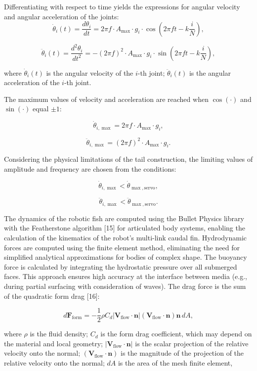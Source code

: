 \documentclass[12pt]{revtex4}
\begin{document}
Differentiating with respect to time yields the expressions for angular velocity and angular acceleration of the joints:
\[
\dot{\theta}_i(t) = \frac{d\theta_i}{dt} = 2\pi f \cdot A_{\max} \cdot g_i \cdot \cos\left(2\pi f t - k \frac{i}{N}\right),
\]

\[
\ddot{\theta}_i(t) = \frac{d^2\theta_i}{dt^2} = -(2\pi f)^2 \cdot A_{\max} \cdot g_i \cdot \sin\left(2\pi f t - k \frac{i}{N}\right),
\]

\noindent where $\dot{\theta}_i(t)$ is the angular velocity of the $i$-th joint; $\ddot{\theta}_i(t)$ is the angular acceleration of the $i$-th joint.

The maximum values of velocity and acceleration are reached when $\cos(\cdot)$ and $\sin(\cdot)$ equal $\pm 1$:

\[
\dot{\theta}_{i,\max} = 2\pi f \cdot A_{\max} \cdot g_i,
\]

\[
\ddot{\theta}_{i,\max} = (2\pi f)^2 \cdot A_{\max} \cdot g_i.
\]

Considering the physical limitations of the tail construction, the limiting values of amplitude and frequency are chosen from the conditions:

\[
\dot{\theta}_{i,\max} < \dot{\theta}_{\max,\text{servo}},
\]

\[
\ddot{\theta}_{i,\max} < \ddot{\theta}_{\max,\text{servo}}.
\]

The dynamics of the robotic fish are computed using the Bullet Physics library with the Featherstone algorithm [15] for articulated body systems, enabling the calculation of the kinematics of the robot's multi-link caudal fin. Hydrodynamic forces are computed using the finite element method, eliminating the need for simplified analytical approximations for bodies of complex shape. The buoyancy force is calculated by integrating the hydrostatic pressure over all submerged faces. This approach ensures high accuracy at the interface between media (e.g., during partial surfacing with consideration of waves). The drag force is the sum of the quadratic form drag [16]:

\[
d\mathbf{F}_{\text{form}} = -\frac{1}{2} \rho C_d |\mathbf{V}_{\text{flow}} \cdot \mathbf{n}| (\mathbf{V}_{\text{flow}} \cdot \mathbf{n}) \mathbf{n} \, dA,
\]

\noindent where $\rho$ is the fluid density; $C_d$ is the form drag coefficient, which may depend on the material and local geometry; $|\mathbf{V}_{\text{flow}} \cdot \mathbf{n}|$ is the scalar projection of the relative velocity onto the normal; $(\mathbf{V}_{\text{flow}} \cdot \mathbf{n})$ is the magnitude of the projection of the relative velocity onto the normal; $dA$ is the area of the mesh finite element,
\end{document}
